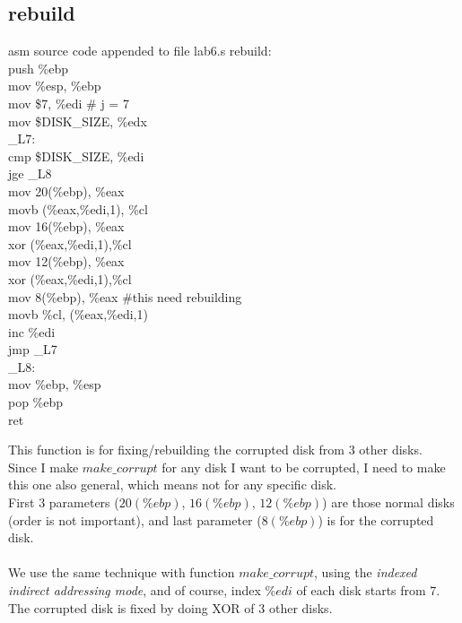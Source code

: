 \documentclass{article}
\begin{document}
\subsection{rebuild}
\begin{multicols}{2}
\begin{GFT}{asm source code appended to file lab6.s}
\+rebuild:\\
\+push \%ebp\\
\+mov \%esp, \%ebp\\
\+mov \$7, \%edi	\# j = 7\\
\+mov \$DISK\_SIZE, \%edx\\
\+\_L7:\\
\+cmp \$DISK\_SIZE, \%edi\\
\+jge \_L8\\
\+mov 20(\%ebp), \%eax\\
\+movb (\%eax,\%edi,1), \%cl\\
\+mov 16(\%ebp), \%eax\\
\+xor (\%eax,\%edi,1),\%cl\\
\+mov 12(\%ebp), \%eax\\
\+xor (\%eax,\%edi,1),\%cl\\
\+mov 8(\%ebp), \%eax	\#this need rebuilding\\
\+movb \%cl, (\%eax,\%edi,1)\\
\+inc \%edi\\
\+jmp \_L7\\
\+\_L8:\\
\+mov \%ebp, \%esp\\
\+pop \%ebp\\
\+ret\\
\end{GFT}
\columnbreak
This function is for fixing/rebuilding the corrupted disk from 3 other disks. \\
Since I make $make\_corrupt$ for any disk I want to be corrupted, I need to make this one also general, which means not for any specific disk. \\
First 3 parameters ($20(\%ebp)$, $16(\%ebp)$, $12(\%ebp)$) are those normal disks (order is not important), and last parameter ($8(\%ebp)$) is for the corrupted disk. \\ \\
We use the same technique with function $make\_corrupt$, using the \textit{indexed indirect addressing mode}, and of course, index $\%edi$ of each disk starts from 7. \\
The corrupted disk is fixed by doing XOR of 3 other disks.
\end{multicols}
\end{document}
